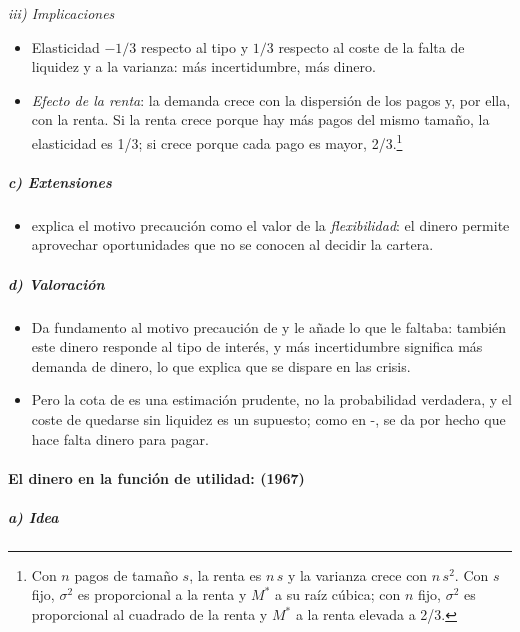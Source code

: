 \documentclass[11pt]{article}
\begin{document}
\hspace*{3.6em}\emph{iii) Implicaciones}

\begin{itemize}
\item Elasticidad $-1/3$ respecto al tipo y $1/3$ respecto al coste de la falta de liquidez y a la varianza: más incertidumbre, más dinero.
\item \emph{Efecto de la renta}: la demanda crece con la dispersión de los pagos y, por ella, con la renta. Si la renta crece porque hay más pagos del mismo tamaño, la elasticidad es 1/3; si crece porque cada pago es mayor, 2/3.\footnote{Con $n$ pagos de tamaño $s$, la renta es $n\,s$ y la varianza crece con $n\,s^2$. Con $s$ fijo, $\sigma^2$ es proporcional a la renta y $M^*$ a su raíz cúbica; con $n$ fijo, $\sigma^2$ es proporcional al cuadrado de la renta y $M^*$ a la renta elevada a 2/3.}
\end{itemize}

\subparagraph{c) Extensiones}

\begin{itemize}
\item \textcite{Goldman1974Flexibility} explica el motivo precaución como el valor de la \emph{flexibilidad}: el dinero permite aprovechar oportunidades que no se conocen al decidir la cartera.
\end{itemize}

\subparagraph{d) Valoración}

\begin{itemize}
\item Da fundamento al motivo precaución de  y le añade lo que le faltaba: también este dinero responde al tipo de interés, y más incertidumbre significa más demanda de dinero, lo que explica que se dispare en las crisis.
\item Pero la cota de  es una estimación prudente, no la probabilidad verdadera, y el coste de quedarse sin liquidez es un supuesto; como en -, se da por hecho que hace falta dinero para pagar.
\end{itemize}

\paragraph{El dinero en la función de utilidad:  (1967)}

\subparagraph{a) Idea}
\end{document}

